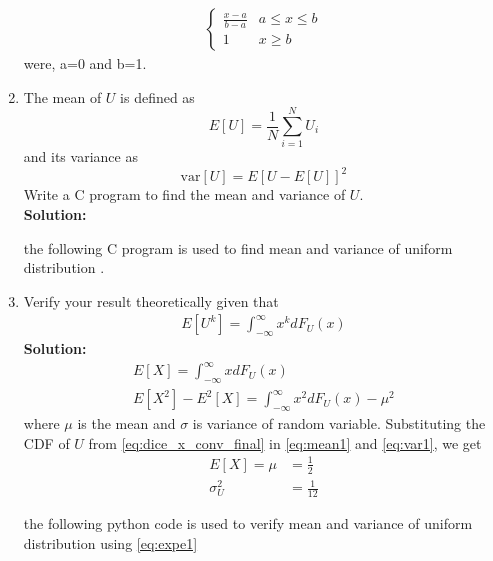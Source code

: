 \documentclass{article}
\numberwithin{equation}{subsection}
\numberwithin{figure}{subsection}
\providecommand{\sbrak}[1]{\ensuremath{{}\left[#1\right]}}
\newcommand{\solution}{\noindent \textbf{Solution: }}
\renewcommand\thesection{\arabic{section}}
\renewcommand\thesubsection{\thesection.\arabic{subsection}}
\begin{document}
\begin{enumerate}[label=\thesubsection.\arabic*,ref=\thesubsection.\arabic{figure}]
\begin{align}
\begin{cases}
\frac{x-a}{b-a} & a \leq x \leq b \\
1 & x \geq b
\end{cases}
\label{eq:dice_x_conv_final}
\end{align}
were, a=0 and b=1.
\item
The mean of $U$ is defined as
%
\begin{equation}
E\sbrak{U} = \frac{1}{N}\sum_{i=1}^{N}U_i
\end{equation}
%
and its variance as
%
\begin{equation}
\text{var}\sbrak{U} = E\sbrak{U- E\sbrak{U}}^2 
\end{equation}
Write a C program to  find the mean and variance of $U$. \\
\solution
\begin{flushleft}
the following C program is used to find mean and variance of uniform distribution .
 \end{flushleft}
 \begin{center}
\end{center}
 \begin{center}
\end{center}
\item Verify your result theoretically given that
%
\begin{align}
E\sbrak{U^k} = \int_{-\infty}^{\infty}x^kdF_{U}(x)
\label{eq:expe1}
\end{align}
\solution
\begin{align}
	\label{eq:mean1}
      E\sbrak{X} = \int_{-\infty}^{\infty}xdF_{U}(x) \\
	\label{eq:var1}
	 E\sbrak{X^2} - E^2\sbrak{X} = \int_{-\infty}^{\infty}x^2dF_{U}(x) - \mu^2
\end{align}  
where $\mu$ is the mean and $\sigma$ is variance of random variable.
Substituting the CDF of $U$ from \eqref{eq:dice_x_conv_final} in \eqref{eq:mean1} and \eqref{eq:var1}, we get
\begin{align}
	\label{eq:mean2}
	E\sbrak{X}=\mu &= \frac{1}{2} \\
	\label{eq:var2}
	\sigma_U^2 &= \frac{1}{12}
\end{align} 
\begin{flushleft}
the following python code is used to verify mean and variance of uniform distribution using \eqref{eq:expe1}

\end{flushleft}
\end{enumerate}
\end{document}
